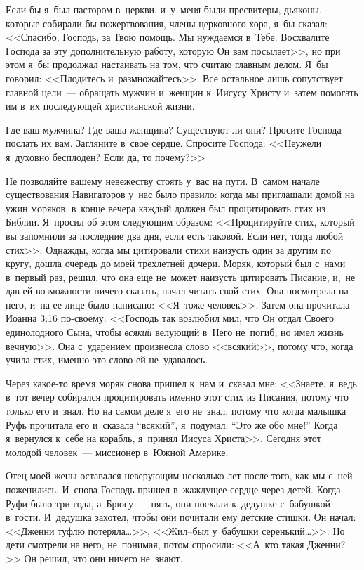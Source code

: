 \documentclass[12pt,article,a4paper,fittopage]{ncc}
\begin{document}
\begin{multicols}{2}
Если бы я~был пастором в~церкви, и~у~меня были пресвитеры, дьяконы, которые собирали бы пожертвования, члены церковного хора, я~бы сказал: <<Спасибо, Господь, за Твою помощь. Мы нуждаемся в~Тебе. Восхвалите Господа за эту дополнительную работу, которую Он вам посылает>>, но при этом я~бы продолжал настаивать на том, что считаю главным делом. Я~бы говорил: <<Плодитесь и~размножайтесь>>. Все остальное лишь сопутствует главной цели~--- обращать мужчин и~женщин к~Иисусу Христу и~затем помогать им в~их последующей христианской жизни.

Где ваш мужчина? Где ваша женщина? Существуют ли они? Просите Господа послать их вам. Загляните в~свое сердце. Спросите Господа: <<Неужели я~духовно бесплоден? Если да, то почему?>>

Не позволяйте вашему невежеству стоять у~вас на пути. В~самом начале существования Навигаторов у~нас было правило: когда мы приглашали домой на ужин моряков, в~конце вечера каждый должен был процитировать стих из Библии. Я~просил об этом следующим образом: <<Процитируйте стих, который вы запомнили за последние два дня, если есть таковой. Если нет, тогда любой стих>>. Однажды, когда мы цитировали стихи наизусть один за другим по кругу, дошла очередь до моей трехлетней дочери. Моряк, который был с~нами в~первый раз, решил, что она еще не~может наизусть цитировать Писание, и,~не дав ей возможности ничего сказать, начал читать свой стих. Она посмотрела на него, и~на ее лице было написано: <<Я~тоже человек>>. Затем она прочитала Иоанна 3:16 по-своему: <<Господь так возлюбил мил, что Он отдал Своего единолодного Сына, чтобы \textit{всякий} велующий в~Него не~погиб, но имел жизнь вечную>>. Она с~ударением произнесла слово <<всякий>>, потому что, когда учила стих, именно это слово ей не~удавалось.

Через какое-то время моряк снова пришел к~нам и~сказал мне: <<Знаете, я~ведь в~тот вечер собирался процитировать именно этот стих из Писания, потому что только его и~знал. Но на самом деле я~его не~знал, потому что когда малышка Руфь прочитала его и~сказала ``всякий'', я~подумал: ``Это же обо мне!'' Когда я~вернулся к~себе на корабль, я~принял Иисуса Христа>>. Сегодня этот молодой человек~--- миссионер в~Южной Америке.

Отец моей жены оставался неверующим несколько лет после того, как мы с~ней поженились. И~снова Господь пришел в~жаждущее сердце через детей. Когда Руфи было три года, а~Брюсу~--- пять, они поехали к~дедушке с~бабушкой в~гости. И~дедушка захотел, чтобы они почитали ему детские стишки. Он начал: <<Дженни туфлю потеряла\ldots{}>>, <<Жил--был у~бабушки серенький\ldots{}>>. Но дети смотрели на него, не~понимая, потом спросили: <<А~кто такая Дженни?>> Он решил, что они ничего не~знают.


\end{multicols}
\end{document}
